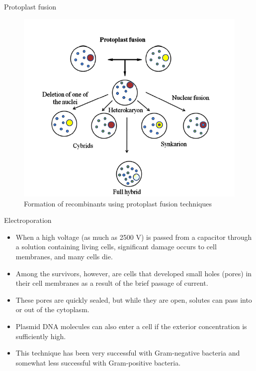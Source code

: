 \documentclass[ignorenonframetext,aspectratio=169]{beamer}
\providecommand{\tightlist}{%
  \setlength{\itemsep}{0pt}\setlength{\parskip}{0pt}}
\begin{document}
\begin{frame}{Protoplast fusion}
\protect\hypertarget{protoplast-fusion-2}{}

\begin{figure}
\includegraphics[width=0.3\linewidth]{./../images/protoplast_fusion} \caption{Formation of recombinants using protoplast fusion techniques}\label{fig:protoplast-fusion}
\end{figure}

\end{frame}

\begin{frame}{Electroporation}
\protect\hypertarget{electroporation}{}

\begin{itemize}
\tightlist
\item
  When a high voltage (as much as 2500 V) is passed from a capacitor
  through a solution containing living cells, significant damage occurs
  to cell membranes, and many cells die.
\item
  Among the survivors, however, are cells that developed small holes
  (pores) in their cell membranes as a result of the brief passage of
  current.
\item
  These pores are quickly sealed, but while they are open, solutes can
  pass into or out of the cytoplasm.
\item
  Plasmid DNA molecules can also enter a cell if the exterior
  concentration is sufficiently high.
\item
  This technique has been very successful with Gram-negative bacteria
  and somewhat less successful with Gram-positive bacteria.
\end{itemize}

\end{frame}
\end{document}
